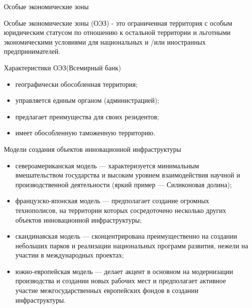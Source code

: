 \documentclass[_Venture_p3.tex]{subfiles}
\begin{document}
 
\begin{frame}{Особые экономические зоны}
\begin{block}{Особые экономические зоны (ОЭЗ)}
	\quad
	- это ограниченная территория с особым юридическим статусом по отношению к остальной территории и льготными экономическими условиями для национальных и /или иностранных предпринимателей.
\end{block}
\end{frame}

 

\begin{frame}{Характеристики ОЭЗ}{(Всемирный банк)}
\begin{itemize}
	\item географически обособленная территория;
	\item управляется единым органом (администрацией);
	\item предлагает преимущества для своих резидентов;
	\item имеет обособленную таможенную территорию.
\end{itemize}
\end{frame}


\begin{frame}[allowframebreaks]{Модели создания объектов инновационной инфраструктуры}{}
\begin{itemize}
	\item североамериканская модель — характеризуется минимальным вмешательством государства и высоким уровнем взаимодействия научной и производственной деятельности (яркий пример — Силиконовая долина);

	\pagebreak
	\item французско-японская модель — предполагает создание огромных технополисов, на территории которых сосредоточено несколько других объектов инновационной инфраструктуры;
	
	\pagebreak
	\item скандинавская модель — сконцентрирована преимущественно на создании небольших парков и реализации национальных программ развития, нежели на участии в международных проектах;

	\pagebreak
	\item южно-европейская модель — делает акцент в основном на модернизации производства и создании новых рабочих мест и предполагает активное участие межгосударственных европейских фондов в создании инфраструктуры.
\end{itemize}
\end{frame}
\end{document}
